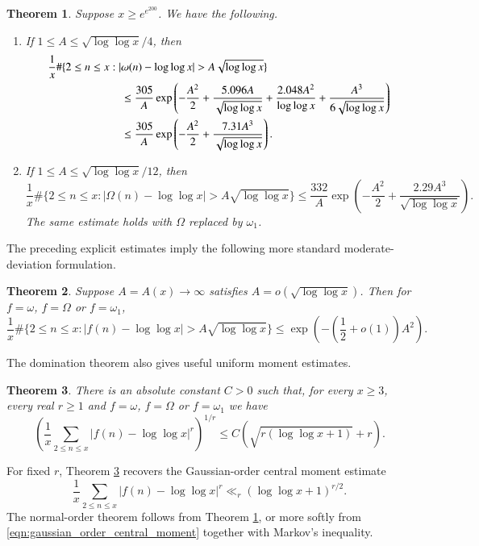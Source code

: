 \documentclass[12pt,a4paper,reqno]{amsart}
\theoremstyle{plain}
\newtheorem{thrm}{Theorem}[section]
\numberwithin{sblmm}{thrm}
\numberwithin{equation}{section}
\begin{document}
\begin{thrm}\label{thm:effective_Gaussian}
    Suppose $x\ge e^{e^{200}}$. We have the following.
    \begin{enumerate}
        \item If $1\le A\le\sqrt{\log\log x}/4$, then
        \begin{align}
            \frac{1}{x}\#\{2\le n\le x:|&\omega(n)-\log\log x|>A\sqrt{\log\log x}\}\\&\le\frac{305}{A}\exp\left(-\frac{A^2}{2}+\frac{5.096A}{\sqrt{\log\log x}}+\frac{2.048A^2}{\log\log x}+\frac{A^3}{6\sqrt{\log\log x}}\right)\label{eqn:effec_gaussian_1}\\
            &\le\frac{305}{A}\exp\left(-\frac{A^2}{2}+\frac{7.31A^3}{\sqrt{\log\log x}}\right).\notag
        \end{align}
        \item If $1\le A\le\sqrt{\log\log x}/12$, then
        \begin{equation}\label{eqn:effec_gaussian_2}
            \frac{1}{x}\#\{2\le n\le x:|\Omega(n)-\log\log x|>A\sqrt{\log\log x}\}\le\frac{332}{A}\exp\left(-\frac{A^2}{2}+\frac{2.29A^3}{\sqrt{\log\log x}}\right).
        \end{equation}
        The same estimate holds with $\Omega$ replaced by $\omega_1$.
    \end{enumerate}
\end{thrm}
The preceding explicit estimates imply the following more standard moderate-deviation formulation.
\begin{thrm}\label{thm:mod_dev_upper_bound}
    Suppose $A=A(x)\to\infty$ satisfies $A=o(\sqrt{\log\log x})$. Then for $f=\omega$, $f=\Omega$ or $f=\omega_1$,
    \begin{equation}\label{eqn:mod_dev_upper_bound}
        \frac{1}{x}\#\{2\le n\le x:|f(n)-\log\log x|>A\sqrt{\log\log x}\}\le\exp\left(-\left(\frac{1}{2}+o(1)\right)A^2\right).
    \end{equation}
\end{thrm}
The domination theorem also gives useful uniform moment estimates.

\begin{thrm}\label{thm:uniform_moment_bounds}
    There is an absolute constant $C>0$ such that, for every $x\ge 3$, every real $r\ge 1$ and $f=\omega$, $f=\Omega$ or $f=\omega_1$ we have
    \begin{equation}\label{eqn:uniform_moments}
        \left(\frac{1}{x}\sum_{2\le n\le x}|f(n)-\log\log x|^r\right)^{1/r}\le C(\sqrt{r(\log\log x+1)}+r).
    \end{equation}
\end{thrm}
For fixed $r$, Theorem \ref{thm:uniform_moment_bounds} recovers the Gaussian-order central moment estimate
\begin{equation}\label{eqn:gaussian_order_central_moment}
    \frac{1}{x}\sum_{2\le n\le x}|f(n)-\log\log x|^r\ll_r(\log\log x+1)^{r/2}.
\end{equation}
The normal-order theorem follows from Theorem \ref{thm:effective_Gaussian}, or more softly from \eqref{eqn:gaussian_order_central_moment} together with Markov's inequality.
\end{document}
